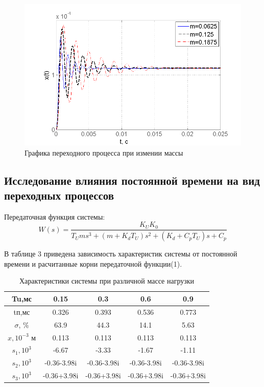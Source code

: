 \documentclass[a4paper, 12pt]{article}
\renewcommand{\arraystretch}{1.5}
\begin{document}
\begin{figure}[h]
	\centering
	\includegraphics[width=0.7\linewidth]{12}
	\caption{Графика переходного процесса при измении массы}
	\label{fig:5}
\end{figure}
\newpage

\begin{center}
\begin{center}
	\section{Исследование влияния постоянной времени на вид переходных процессов}
\end{center}
\end{center}
Передаточная функция системы:\\
\begin{equation}
W(s)=\frac{K_UK_0}{T_Ums^3+(m+K_dT_U)s^2+(K_d+C_pT_U)s+C_p}
\end{equation}\par
В таблице 3 приведена зависимость характеристик системы от постоянной времени и расчитанные корни передаточной функции(1).   
\begin{table}[h!]
\caption{Характеристики системы при различной массе нагрузки }
\renewcommand{\arraystretch}{1}
\renewcommand{\tabcolsep}{0.75cm}
\begin{tabular}{|c|c|c|c|c|}
	\hline
	Tu,мс	&	0.15	&	0.3	&	0.6	&	0.9	\\
	\hline
	tп,мс	&	0.326	&	0.393	&	0.536	&	0.773	\\
	\hline
	$\sigma$, \%	&	63.9	&	44.3	&	14.1	&	5.63	\\
	\hline
	$x,10^{-3} \text{ м}$	&	0.113	&	0.113	&	0.113	&	0.113	\\
	\hline
	$s_1, 10^{3}$	&	-6.67	&	-3.33	&	-1.67	&	-1.11	\\
	\hline
	$s_2, 10^{3}$	&	-0.36-3.98i	&	-0.36-3.98i	&	-0.36-3.98i	&	-0.36-3.98i	\\
	\hline
	$s_3, 10^{3}$	&	-0.36+3.98i	&	-0.36+3.98i	&	-0.36+3.98i	&	-0.36+3.98i	\\
	\hline
\end{tabular}
\end{table}\par
\end{document}
